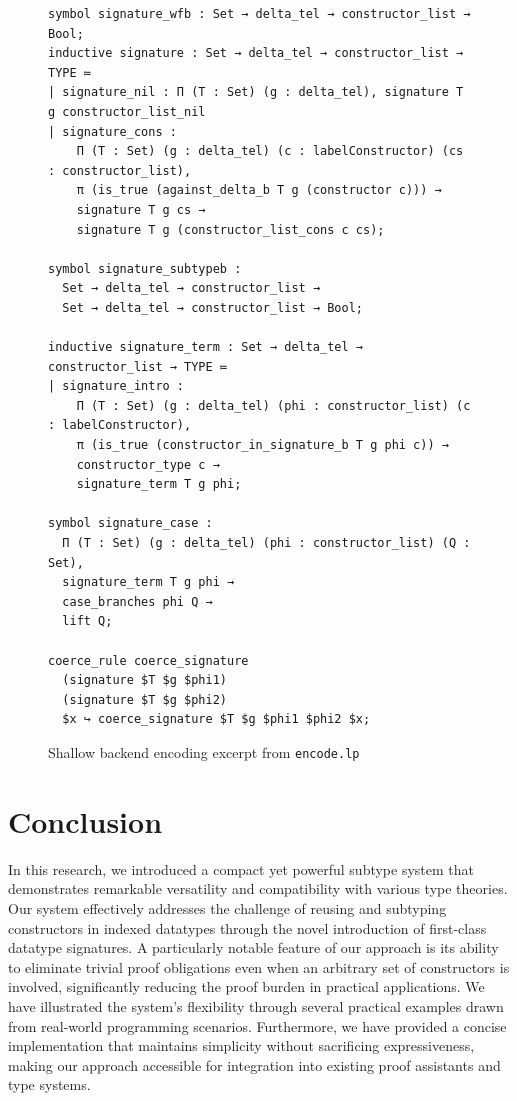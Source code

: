 \documentclass[a4paper, anonymous, UKenglish,cleveref, autoref, thm-restate]{lipics-v2021}
\begin{document}
\begin{figure}[!ht]
\begin{lstlisting}[language=Lambdapi, basicstyle={\ttfamily\scriptsize\upshape}, inputencoding=utf8, extendedchars=true]
symbol signature_wfb : Set → delta_tel → constructor_list → Bool;
inductive signature : Set → delta_tel → constructor_list → TYPE ≔
| signature_nil : Π (T : Set) (g : delta_tel), signature T g constructor_list_nil
| signature_cons :
    Π (T : Set) (g : delta_tel) (c : labelConstructor) (cs : constructor_list),
    π (is_true (against_delta_b T g (constructor c))) →
    signature T g cs →
    signature T g (constructor_list_cons c cs);

symbol signature_subtypeb :
  Set → delta_tel → constructor_list →
  Set → delta_tel → constructor_list → Bool;

inductive signature_term : Set → delta_tel → constructor_list → TYPE ≔
| signature_intro :
    Π (T : Set) (g : delta_tel) (phi : constructor_list) (c : labelConstructor),
    π (is_true (constructor_in_signature_b T g phi c)) →
    constructor_type c →
    signature_term T g phi;

symbol signature_case :
  Π (T : Set) (g : delta_tel) (phi : constructor_list) (Q : Set),
  signature_term T g phi →
  case_branches phi Q →
  lift Q;

coerce_rule coerce_signature
  (signature $T $g $phi1)
  (signature $T $g $phi2)
  $x ↪ coerce_signature $T $g $phi1 $phi2 $x;
\end{lstlisting}
\caption{Shallow backend encoding excerpt from \texttt{encode.lp}}
\label{fig:encode-shallow}
\end{figure}

\section{Conclusion}
\label{sec:conclusion}
In this research, we introduced a compact yet powerful subtype system that demonstrates remarkable versatility and compatibility with various type theories. Our system effectively addresses the challenge of reusing and subtyping constructors in indexed datatypes through the novel introduction of first-class datatype signatures. A particularly notable feature of our approach is its ability to eliminate trivial proof obligations even when an arbitrary set of constructors is involved, significantly reducing the proof burden in practical applications. We have illustrated the system's flexibility through several practical examples drawn from real-world programming scenarios. Furthermore, we have provided a concise implementation that maintains simplicity without sacrificing expressiveness, making our approach accessible for integration into existing proof assistants and type systems.
\end{document}

